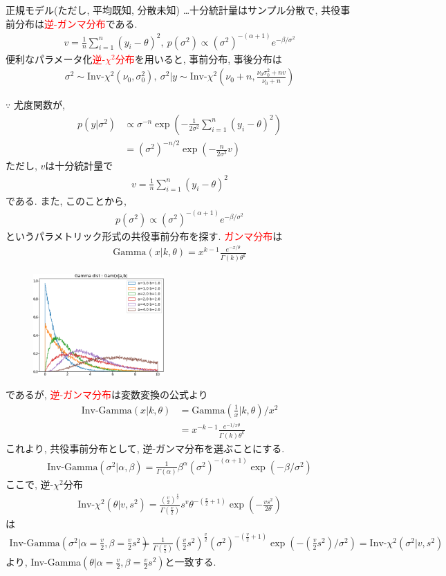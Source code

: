 \documentclass[11pt,a4pape,dvipdfmx]{jarticle}
\newcommand{\eqn}[1]{\begin{align*}#1\end{align*}}
\newcommand{\tcr}[1]{\textcolor{red}{#1}}
\begin{document}
\begin{itembox}[l]{正規モデル(ただし, 平均既知, 分散未知)}
…十分統計量はサンプル分散で, 共役事前分布は\tcr{逆-ガンマ分布}である.
\eqn{v=\frac{1}{n}\sum_{i=1}^n(y_i-\theta)^2,\ p(\sigma^2)\propto (\sigma^2)^{-(\alpha+1)}e^{-\beta/\sigma^2}}
便利なパラメータ化\tcr{逆-$\chi^2$分布}を用いると, 事前分布, 事後分布は
\eqn{\sigma^2\sim \text{Inv-}\chi^2(\nu_0,\sigma_0^2),\ \sigma^2|y\sim \text{Inv-}\chi^2\left(\nu_0+n,\tfrac{\nu_0\sigma_0^2+nv}{\nu_0+n}\right)}
\end{itembox}
$\because$
尤度関数が,
\eqn{p(y|\sigma^2)&\propto \sigma^{-n}\exp\left(-\frac{1}{2\sigma^2}\sum_{i=1}^n(y_i-\theta)^2\right)\\
&=(\sigma^2)^{-n/2}\exp \left(-\frac{n}{2\sigma^2}v\right)}
ただし, $v$は十分統計量で
\eqn{v=\frac{1}{n}\sum_{i=1}^n(y_i-\theta)^2}
である.
また, このことから, 
\eqn{p(\sigma^2)\propto (\sigma^2)^{-(\alpha+1)}e^{-\beta/\sigma^2}}
というパラメトリック形式の共役事前分布を探す.
\tcr{ガンマ分布}は
\eqn{\text{Gamma}(x|k,\theta)=x^{k-1}\frac{e^{-x/\theta}}{\Gamma(k)\theta^k}}
\begin{figure}[H]
\begin{center}
\includegraphics[clip, width=5cm]{../2/code/Gamma.png}
\end{center}
\end{figure}
であるが, \tcr{逆-ガンマ分布}は変数変換の公式より
\eqn{\text{Inv-Gamma}(x|k,\theta)
&=\text{Gamma}\left(\tfrac{1}{x}|k,\theta\right)/x^2\\
&=x^{-k-1}\frac{e^{-1/x\theta}}{\Gamma(k)\theta^k}}
これより, 共役事前分布として, 逆-ガンマ分布を選ぶことにする.
\eqn{\text{Inv-Gamma}(\sigma^2|\alpha,\beta)=\frac{1}{\Gamma(\alpha)} \beta^{\alpha} (\sigma^2)^{-(\alpha+1)} \exp\left(-\beta/\sigma^2 \right)}
ここで, 逆-$\chi^2$分布
\eqn{\text{Inv-}\chi^2(\theta|v,s^2)=\frac{\left(\tfrac{v}{2}\right)^{\tfrac{v}{2}}}{\Gamma\left(\tfrac{v}{2}\right)}s^v\theta^{-\left(\tfrac{v}{2}+1\right)}\exp\left(-\tfrac{vs^2}{2\theta}\right)}
は
\eqn{\text{Inv-Gamma}(\sigma^2|\alpha=\tfrac{v}{2},\beta=\tfrac{v}{2}s^2)&
=\frac{1}{\Gamma(\tfrac{v}{2})} (\tfrac{v}{2}s^2)^{\tfrac{v}{2}} (\sigma^2)^{-(\tfrac{v}{2}+1)} \exp\left(-(\tfrac{v}{2} s^2)/\sigma^2 \right)=\text{Inv-}\chi^2(\sigma^2|v,s^2)}
より, Inv-Gamma$\left(\theta|\alpha=\tfrac{v}{2},\beta=\tfrac{v}{2}s^2\right)$と一致する.
\end{document}
